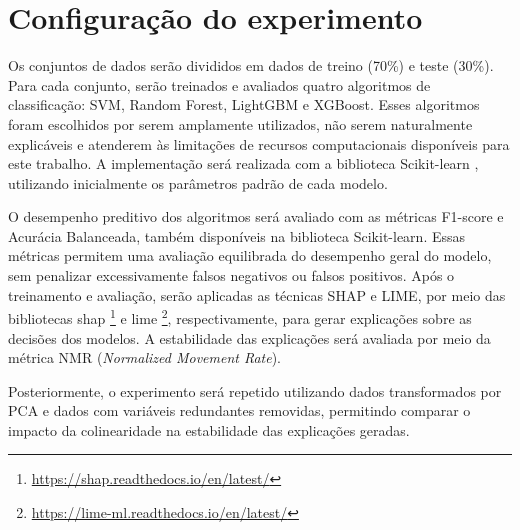 \section{Configuração do experimento}\label{sec:cofiguracao_experimentos}
Os conjuntos de dados serão divididos em dados de treino (70\%) e teste (30\%). Para cada conjunto, serão treinados e avaliados quatro algoritmos de classificação: SVM, Random Forest, LightGBM e XGBoost. Esses algoritmos foram escolhidos por serem amplamente utilizados, não serem naturalmente explicáveis e atenderem às limitações de recursos computacionais disponíveis para este trabalho. A implementação será realizada com a biblioteca Scikit-learn \cite{scikit-learn}, utilizando inicialmente os parâmetros padrão de cada modelo.

O desempenho preditivo dos algoritmos será avaliado com as métricas F1-score e Acurácia Balanceada, também disponíveis na biblioteca Scikit-learn. Essas métricas permitem uma avaliação equilibrada do desempenho geral do modelo, sem penalizar excessivamente falsos negativos ou falsos positivos. Após o treinamento e avaliação, serão aplicadas as técnicas SHAP e LIME, por meio das bibliotecas shap \footnote{\url{https://shap.readthedocs.io/en/latest/}} e lime \footnote{\url{https://lime-ml.readthedocs.io/en/latest/}}, respectivamente, para gerar explicações sobre as decisões dos modelos. A estabilidade das explicações será avaliada por meio da métrica NMR (\textit{Normalized Movement Rate}).

Posteriormente, o experimento será repetido utilizando dados transformados por PCA e dados com variáveis redundantes removidas, permitindo comparar o impacto da colinearidade na estabilidade das explicações geradas.







